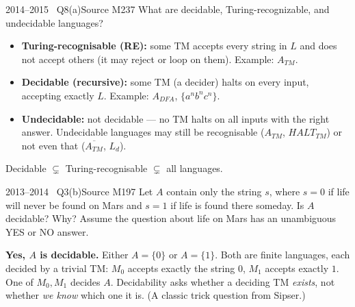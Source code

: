 \documentclass[11pt,a4paper]{article}
\begin{document}
\begin{question}{2014--2015 \textbullet\ Q8(a)}{Source M23}{7}
What are decidable, Turing-recognizable, and undecidable languages?
\end{question}
\begin{solution}
\begin{itemize}
\item \textbf{Turing-recognisable (RE):} some TM accepts every string in $L$ and does not accept others (it may reject or loop on them). Example: $A_{TM}$.
\item \textbf{Decidable (recursive):} some TM (a decider) halts on every input, accepting exactly $L$. Example: $A_{DFA}$, $\{a^nb^nc^n\}$.
\item \textbf{Undecidable:} not decidable --- no TM halts on all inputs with the right answer. Undecidable languages may still be recognisable ($A_{TM}$, $\mathit{HALT}_{TM}$) or not even that ($\overline{A_{TM}}$, $L_d$).
\end{itemize}
Decidable $\subsetneq$ Turing-recognisable $\subsetneq$ all languages.
\end{solution}

\begin{question}{2013--2014 \textbullet\ Q3(b)}{Source M19}{7}
Let $A$ contain only the string $s$, where $s=0$ if life will never be found on Mars and $s=1$ if life is found there someday. Is $A$ decidable? Why? Assume the question about life on Mars has an unambiguous YES or NO answer.
\end{question}
\begin{solution}
\textbf{Yes, $A$ is decidable.} Either $A=\{0\}$ or $A=\{1\}$. Both are finite languages, each decided by a trivial TM: $M_0$ accepts exactly the string $0$, $M_1$ accepts exactly $1$. One of $M_0,M_1$ decides $A$. Decidability asks whether a deciding TM \emph{exists}, not whether \emph{we know} which one it is. (A classic trick question from Sipser.)
\end{solution}
\end{document}
